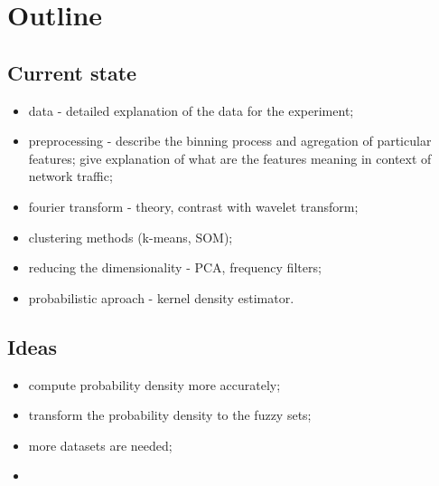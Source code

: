 \documentclass[a4paper]{IEEEtran}
\begin{document}
\section{Outline}
\subsection{Current state}
\begin{itemize}
	\item data - detailed explanation of the data for the experiment;
	\item preprocessing - describe the binning process and agregation of particular features; give explanation of what are the features meaning in context of network traffic;
	\item fourier transform - theory, contrast with wavelet transform;
	\item clustering methods (k-means, SOM);
	\item reducing the dimensionality - PCA, frequency filters;
	\item probabilistic aproach - kernel density estimator.
\end{itemize}
\subsection{Ideas}
\begin{itemize}
	\item compute probability density more accurately;
	\item transform the probability density to the fuzzy sets;
	\item more datasets are needed;
	\item 
\end{itemize}


\end{document}
